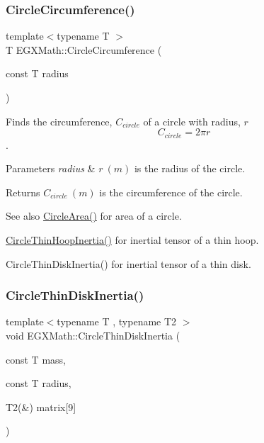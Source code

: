 \subsubsection{\texorpdfstring{Circle\+Circumference()}{CircleCircumference()}}
{\footnotesize\ttfamily template$<$typename T $>$ \\
T E\+G\+X\+Math\+::\+Circle\+Circumference (\begin{DoxyParamCaption}\item[{const T}]{radius }\end{DoxyParamCaption})}



Finds the circumference, $C_{circle}$ of a circle with radius, $r$ \[ C_{circle}=2 \pi r \]. 


\begin{DoxyParams}{Parameters}
{\em radius} & $ r\ (m)$ is the radius of the circle. \\
\hline
\end{DoxyParams}
\begin{DoxyReturn}{Returns}
$ C_{circle}\ (m)$ is the circumference of the circle. 
\end{DoxyReturn}
\begin{DoxySeeAlso}{See also}
\mbox{\hyperlink{group___e_g_x_math-_geometry-2_d-_circle_gabf5aadec991cc2bbf9d74fd83c46f40d}{Circle\+Area()}} for area of a circle. 

\mbox{\hyperlink{group___e_g_x_math-_geometry-2_d-_circle_ga902bfe249e733c8d2917600cc4a3392b}{Circle\+Thin\+Hoop\+Inertia()}} for inertial tensor of a thin hoop. 

Circle\+Thin\+Disk\+Inertia() for inertial tensor of a thin disk. 
\end{DoxySeeAlso}
\mbox{\label{group___e_g_x_math-_geometry-2_d-_circle_ga4d5e95f0986ab5e760679adeccb53181}} 
\subsubsection{\texorpdfstring{Circle\+Thin\+Disk\+Inertia()}{CircleThinDiskInertia()}}
{\footnotesize\ttfamily template$<$typename T , typename T2 $>$ \\
void E\+G\+X\+Math\+::\+Circle\+Thin\+Disk\+Inertia (\begin{DoxyParamCaption}\item[{const T}]{mass,  }\item[{const T}]{radius,  }\item[{T2(\&)}]{matrix\mbox{[}9\mbox{]} }\end{DoxyParamCaption})}



